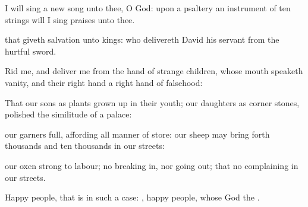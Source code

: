 {\Q {}I will
sing a
new
song unto thee, O
God: upon a
psaltery
{} an instrument of ten
strings will I sing
praises unto thee.


\par }{\Q {} that
giveth
salvation unto
kings: who
delivereth
David his
servant from the
hurtful
sword.


\par }{\Q {}Rid me, and
deliver me from the
hand of
strange
children, whose
mouth
speaketh
vanity, and their right
hand
{} a right
hand of
falsehood:


\par }{\Q {}That our
sons
{} as
plants grown
up in their
youth;
{} our
daughters
{} as corner
stones,
polished
{} the
similitude of a
palace:


\par }{\Q {} our
garners
{}
full,
affording all manner of
store:
{} our
sheep may bring forth
thousands and ten
thousands in our
streets:


\par }{\Q {} our
oxen
{} strong to
labour;
{} no breaking
in, nor going
out; that
{} no
complaining in our
streets.


\par }{\Q {}Happy
{}
people, that is in such a
case:
{},
happy
{}
people, whose
God
{} the
{}.




\par }
